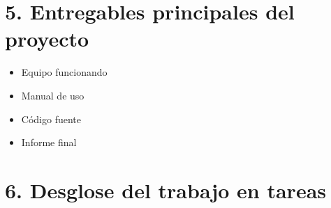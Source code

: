 \documentclass[11pt]{charter}
\begin{document}
\section{5. Entregables principales del proyecto}
\label{sec:entregables}

\begin{itemize}
\item Equipo funcionando
\item Manual de uso
\item Código fuente
\item Informe final

\end{itemize}


\section{6. Desglose del trabajo en tareas}
\label{sec:wbs}
\end{document}
